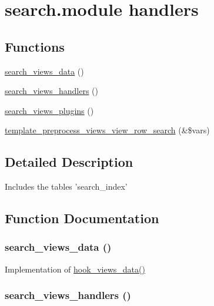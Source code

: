 \hypertarget{group__views__search__module}{
\section{search.module handlers}
\label{group__views__search__module}
}
\subsection*{Functions}
\begin{CompactItemize}
\item 
\hyperlink{group__views__search__module_gd91fdcb8037644087387a30d3a5719ee}{search\_\-views\_\-data} ()
\item 
\hyperlink{group__views__search__module_gee2b59b8bd9fcc8bd9ff152f48f6b4b8}{search\_\-views\_\-handlers} ()
\item 
\hyperlink{group__views__search__module_gef27a11e726ee0039e3ffeed38562df3}{search\_\-views\_\-plugins} ()
\item 
\hyperlink{group__views__search__module_gd2005db0a4841d084cadac887649bf6f}{template\_\-preprocess\_\-views\_\-view\_\-row\_\-search} (\&\$vars)
\end{CompactItemize}


\subsection{Detailed Description}
Includes the tables 'search\_\-index' 

\subsection{Function Documentation}
\hypertarget{group__views__search__module_gd91fdcb8037644087387a30d3a5719ee}{
\subsubsection[{search\_\-views\_\-data}]{\setlength{\rightskip}{0pt plus 5cm}search\_\-views\_\-data ()}}
\label{group__views__search__module_gd91fdcb8037644087387a30d3a5719ee}


Implementation of \hyperlink{group__views__hooks_g227057901681e4a33e33c199c7a8c989}{hook\_\-views\_\-data()} \hypertarget{group__views__search__module_gee2b59b8bd9fcc8bd9ff152f48f6b4b8}{
\subsubsection[{search\_\-views\_\-handlers}]{\setlength{\rightskip}{0pt plus 5cm}search\_\-views\_\-handlers ()}}
\label{group__views__search__module_gee2b59b8bd9fcc8bd9ff152f48f6b4b8}



